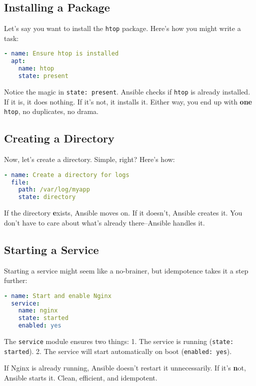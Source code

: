 \subsection{Installing a Package}

Let's say you want to install the \texttt{htop} package. Here's how you might write a task:
\begin{lstlisting}[language=yaml, caption=Installing a Package]
- name: Ensure htop is installed
  apt:
    name: htop
    state: present
\end{lstlisting}

Notice the magic in \texttt{state: present}. Ansible checks if \texttt{htop} is already installed. If it is, it does nothing. If it's not, it installs it. Either way, you end up with \textbf{one} \texttt{htop}, no duplicates, no drama.

\subsection{Creating a Directory}

Now, let's create a directory. Simple, right? Here's how:
\begin{lstlisting}[language=yaml, caption=Creating a Directory]
- name: Create a directory for logs
  file:
    path: /var/log/myapp
    state: directory
\end{lstlisting}

If the directory \textbf{e}xists, Ansible moves on. If it doesn't, Ansible creates it. You don't have to care about what's already there--Ansible handles it.

\subsection{Starting a Service}

Starting a service might seem like a no-brainer, but idempotence takes it a step further:
\begin{lstlisting}[language=yaml, caption=Starting a Service]
- name: Start and enable Nginx
  service:
    name: nginx
    state: started
    enabled: yes
\end{lstlisting}

The \texttt{service} module ensures two things:
1. The service is running (\texttt{state: started}).
2. The service will start automatically on boot (\texttt{enabled: yes}).

If Nginx is already running, Ansible doesn't restart it unnecessarily. If it's \textbf{n}ot, Ansible starts it. Clean, efficient, and idempotent.

